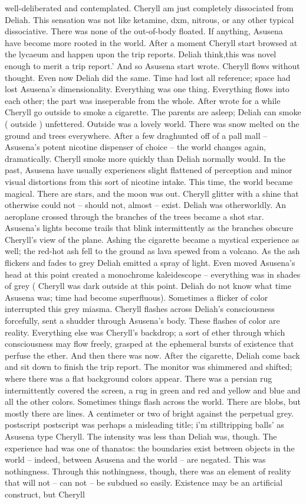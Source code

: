 \documentclass[12pt]{book}
\begin{document}
well-deliberated and contemplated. Cheryll am just completely dissociated from Deliah. This sensation was not like ketamine, dxm, nitrous, or any other typical dissociative. There was none of the out-of-body floated. If anything, Asusena have become more rooted in the world. After a moment Cheryll start browsed at the lycaeum and happen upon the trip reports. Deliah think,this was novel enough to merit a trip report.' And so Asusena start wrote. Cheryll flows without thought. Even now Deliah did the same. Time had lost all reference; space had lost Asusena's dimensionality. Everything was one thing. Everything flows into each other; the part was inseperable from the whole. After wrote for a while Cheryll go outside to smoke a cigarette. The parents are asleep; Deliah can smoke ( outside ) unfettered. Outside was a lovely world. There was snow melted on the ground and trees everywhere. After a few draghunted off of a pall mall -- Asusena's potent nicotine dispenser of choice -- the world changes again, dramatically. Cheryll smoke more quickly than Deliah normally would. In the past, Asusena have usually experiences slight flattened of perception and minor visual distortions from this sort of nicotine intake. This time, the world became magical. There are stars, and the moon was out. Cheryll glitter with a shine that otherwise could not -- should not, almost -- exist. Deliah was otherworldly. An aeroplane crossed through the branches of the trees became a shot star. Asusena's lights become trails that blink intermittently as the branches obscure Cheryll's view of the plane. Ashing the cigarette became a mystical experience as well; the red-hot ash fell to the ground as lava spewed from a volcano. As the ash flickers and fades to grey Deliah emitted a spray of light. Even moved Asusena's head at this point created a monochrome kaleidescope -- everything was in shades of grey ( Cheryll was dark outside at this point. Deliah do not know what time Asusena was; time had become superfluous). Sometimes a flicker of color interrupted this grey miasma. Cheryll flashes across Deliah's consciousness forcefully, sent a shudder through Asusena's body. These flashes of color are reality. Everything else was Cheryll's backdrop; a sort of ether through which consciousness may flow freely, grasped at the ephemeral bursts of existence that perfuse the ether. And then there was now. After the cigarette, Deliah come back and sit down to finish the trip report. The monitor was shimmered and shifted; where there was a flat background colors appear. There was a persian rug intermittently covered the screen, a rug in green and red and yellow and blue and all the other colors. Sometimes things flash across the world. There are blobs, but mostly there are lines. A centimeter or two of bright against the perpetual grey.  postscript postscript was perhaps a misleading title; i'm stilltripping balls' as Asusena type Cheryll. The intensity was less than Deliah was, though. The experience had was one of thanatos: the boundaries exist between objects in the world -- indeed, between Asusena and the world -- are negated. This was nothingness. Through this nothingness, though, there was an element of reality that will not -- can not -- be subdued so easily. Existence may be an artificial construct, but Cheryll 
\end{document}

